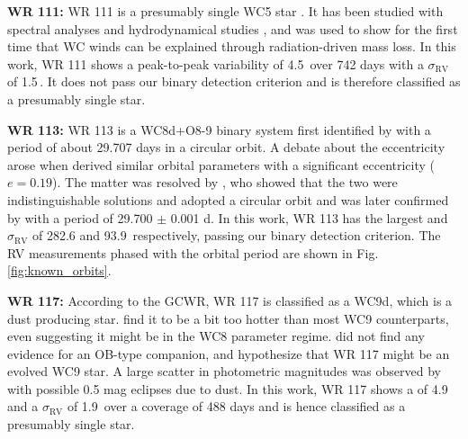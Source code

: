 
\textbf{WR 111:} WR 111 is a presumably single WC5 star \citep{1999aNiemela,2001vanderHucht}. It has been studied with spectral analyses and hydrodynamical studies \citep{2002Grafener,2005GrafenerHamann,2012Sander}, and was used to show for the first time that WC winds can be explained through radiation-driven mass loss. In this work, WR 111 shows a peak-to-peak variability of 4.5\,\kms{} over 742 days with a $\sigma_\textrm{RV}$ of 1.5\,\kms{}. It does not pass our binary detection criterion and is therefore classified as a presumably single star.


\textbf{WR 113:} WR 113 is a WC8d+O8-9 binary system first identified by \citet{1981MasseyNiemela} with a period of about 29.707 days in a circular orbit. A debate about the eccentricity arose when \citet{1996Niemela} derived similar orbital parameters with a significant eccentricity ($e=0.19$). The matter was resolved by \citet{2012David-Uraz}, who showed that the two were indistinguishable solutions and adopted a circular orbit and was later confirmed by \citet{2018Hill} with a period of 29.700 $\pm$ 0.001 d. In this work, WR 113 has the largest \DelRV{} and $\sigma_\textrm{RV}$ of 282.6 and 93.9\,\kms{} respectively, passing our binary detection criterion. The RV measurements phased with the orbital period are shown in Fig. \ref{fig:known_orbits}.


\textbf{WR 117:} According to the GCWR, WR 117 is classified as a WC9d, which is a dust producing star. \citet{2012Sander} find it to be a bit too hotter than most WC9 counterparts, even suggesting it might be in the WC8 parameter regime. \citet{2005Williams} did not find any evidence for an OB-type companion, and hypothesize that WR 117 might be an evolved WC9 star. A large scatter in photometric magnitudes was observed by \citet{2014Williams} with possible 0.5 mag eclipses due to dust. In this work, WR 117 shows a \DelRV{} of 4.9\,\kms{} and a $\sigma_\textrm{RV}$ of 1.9\,\kms{} over a coverage of 488 days and is hence classified as a presumably single star.

